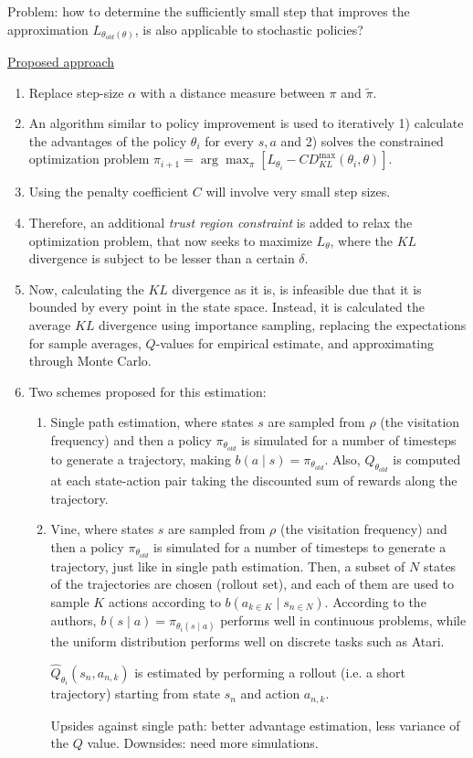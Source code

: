 \documentclass[12pt, english]{article}
\begin{document}
Problem: how to determine the sufficiently small step that improves the approximation $L_{\theta_{old}(\theta)}$, is also applicable to stochastic policies?


\underline{Proposed approach}

\begin{enumerate}
  \item Replace step-size $\alpha$ with a distance measure between $\pi$ and $\tilde{\pi}$.
  \item An algorithm similar to policy improvement is used to iteratively 1) calculate the advantages of the policy $\theta_i$ for every $s,a$ and 2) solves the constrained optimization problem $\pi_{i+1} = \arg\max_\pi [L_{\theta_i} - C D_{KL}^{\max}(\theta_i, \theta)]$.
  \item Using the penalty coefficient $C$ will involve very small step sizes.
  \item Therefore, an additional \textit{trust region constraint} is added to relax the optimization problem, that now seeks to maximize $L_{\theta}$, where the $KL$ divergence is subject to be lesser than a certain $\delta$.
  \item Now, calculating the $KL$ divergence as it is, is infeasible due that it is bounded by every point in the state space.
  Instead, it is calculated the average $KL$ divergence using importance sampling, replacing the expectations for sample averages, $Q$-values for empirical estimate, and approximating through Monte Carlo.
  \item Two schemes proposed for this estimation:

  \begin{enumerate}
    \item Single path estimation, where states $s$ are sampled from $\rho$ (the visitation frequency) and then a policy $\pi_{\theta_{old}}$ is simulated for a number of timesteps to generate a trajectory, making $b(a \mid s) = \pi_{\theta_{old}}$.
    Also, $Q_{\theta_{old}}$ is computed at each state-action pair taking the discounted sum of rewards along the trajectory.

    \item Vine, where states $s$ are sampled from $\rho$ (the visitation frequency) and then a policy $\pi_{\theta_{old}}$ is simulated for a number of timesteps to generate a trajectory, just like in single path estimation.
    Then, a subset of $N$ states of the trajectories are chosen (rollout set), and each of them are used to sample $K$ actions according to $b(a_{k \in K} \mid s_{n \in N})$. According to the authors, $b(s \mid a) = \pi_{\theta_i (s \mid a)}$ performs well in continuous problems, while the uniform distribution performs well on discrete tasks such as Atari.

    $\hat{Q}_{\theta_i}(s_n, a_{n,k})$ is estimated by performing a rollout (i.e. a short trajectory) starting from state $s_n$ and action $a_{n,k}$.

    Upsides against single path: better advantage estimation, less variance of the $Q$ value.
    Downsides: need more simulations.
  \end{enumerate}

\end{enumerate}
\end{document}
